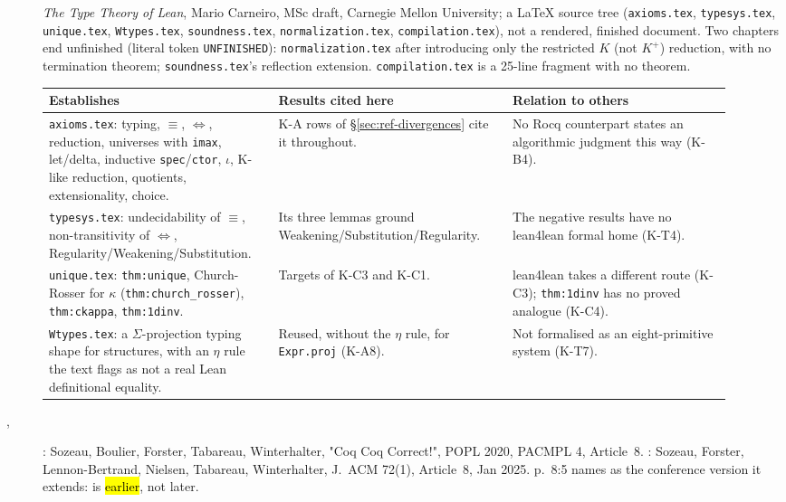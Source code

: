 \begin{description}
\item[]  \emph{The Type Theory of Lean}, Mario Carneiro, MSc draft,
Carnegie Mellon University; a \LaTeX{} source tree (\texttt{axioms.tex}, \texttt{typesys.tex},
\texttt{unique.tex}, \texttt{Wtypes.tex}, \texttt{soundness.tex}, \texttt{normalization.tex},
\texttt{compilation.tex}), not a rendered, finished document. Two chapters end unfinished
(literal token \texttt{UNFINISHED}): \texttt{normalization.tex} after introducing only the
restricted $K$ (not $K^+$) reduction, with no termination theorem; \texttt{soundness.tex}'s
reflection extension. \texttt{compilation.tex} is a 25-line fragment with no theorem.

\par\smallskip\noindent
\begin{tabular}{p{0.3\linewidth}p{0.32\linewidth}p{0.3\linewidth}}
\toprule
Establishes & Results cited here & Relation to others \\
\midrule
\texttt{axioms.tex}: typing, $\equiv$, $\Leftrightarrow$, reduction, universes with
\texttt{imax}, let/delta, inductive \texttt{spec}/\texttt{ctor}, $\iota$, K-like reduction,
quotients, extensionality, choice. &
K-A rows of \S\ref{sec:ref-divergences} cite it throughout. &
No Rocq counterpart states an algorithmic judgment this way (K-B4). \\
\texttt{typesys.tex}: undecidability of $\equiv$, non-transitivity of $\Leftrightarrow$,
Regularity/Weakening/Substitution. &
Its three lemmas ground Weakening/Substitution/Regularity. &
The negative results have no lean4lean formal home (K-T4). \\
\texttt{unique.tex}: \texttt{thm:unique}, Church-Rosser for $\kappa$
(\texttt{thm:church\_rosser}), \texttt{thm:ckappa}, \texttt{thm:1dinv}. &
Targets of K-C3 and K-C1. &
lean4lean takes a different route (K-C3); \texttt{thm:1dinv} has no proved analogue (K-C4). \\
\texttt{Wtypes.tex}: a $\Sigma$-projection typing shape for structures, with an $\eta$ rule the
text flags as not a real Lean definitional equality. &
Reused, without the $\eta$ rule, for \texttt{Expr.proj} (K-A8). &
Not formalised as an eight-primitive system (K-T7). \\
\bottomrule
\end{tabular}\par\smallskip

\item[, ]  : Sozeau, Boulier, Forster, Tabareau,
Winterhalter, "Coq Coq Correct!", POPL 2020, PACMPL 4, Article~8. : Sozeau, Forster,
Lennon-Bertrand, Nielsen, Tabareau, Winterhalter, J.~ACM 72(1), Article~8, Jan 2025. 
p.~8:5 names  as the conference version it extends:  is \hl{earlier}, not later.


\end{description}
